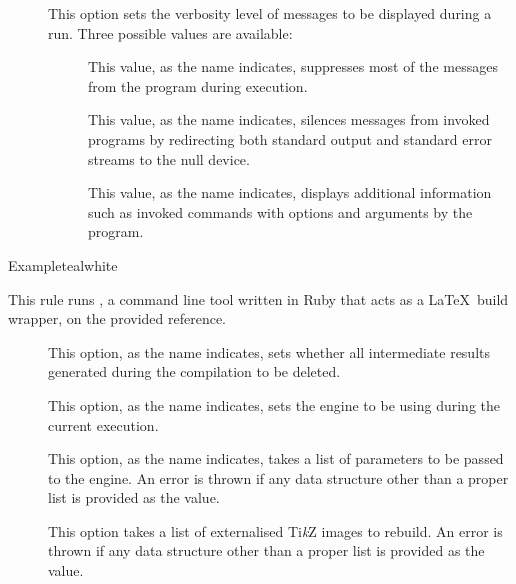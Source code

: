 \begin{description}
\begin{description}
\item[]
This option sets the verbosity level of messages to be displayed during a run. Three possible values are available:

\begin{description}
\item[] This value, as the name indicates, suppresses most of the messages from the program during execution.

\item[] This value, as the name indicates, silences messages from invoked programs by redirecting both standard output and standard error streams to the null device.

\item[] This value, as the name indicates, displays additional information such as invoked commands with options and arguments by the program.
\end{description}
\end{description}

\begin{codebox}{Example}{teal}{\icnote}{white}
\end{codebox}

\item[\rulebox{ltx2any}]
This rule runs , a command line tool written in Ruby that acts as a \LaTeX\ build wrapper, on the provided  reference.

\begin{description}
\item[] This option, as the name indicates, sets whether all intermediate results generated during the compilation to be deleted.

\item[] This option, as the name indicates, sets the engine to be using during the current execution.

\item[] This option, as the name indicates, takes a list of parameters to be passed to the engine. An error is thrown if any data structure other than a proper list is provided as the value.

\item[] This option takes a list of externalised Ti\textit{k}Z images to rebuild. An error is thrown if any data structure other than a proper list is provided as the value.


\end{description}
\end{description}
